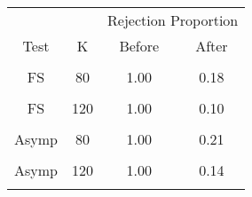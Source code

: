 \begin{table}[!h]
\centering
\begin{tabular}{cccc}
\toprule
\multicolumn{1}{c}{ } & \multicolumn{1}{c}{ } & \multicolumn{2}{c}{Rejection Proportion} \\
\cmidrule(l{3pt}r{3pt}){3-4}
Test & K & Before & After\\
\midrule
\cellcolor{gray!6}{FS} & \cellcolor{gray!6}{60} & \cellcolor{gray!6}{1.00} & \cellcolor{gray!6}{0.13}\\
FS & 80 & 1.00 & 0.18\\
\cellcolor{gray!6}{FS} & \cellcolor{gray!6}{100} & \cellcolor{gray!6}{1.00} & \cellcolor{gray!6}{0.13}\\
FS & 120 & 1.00 & 0.10\\
\cellcolor{gray!6}{Asymp} & \cellcolor{gray!6}{60} & \cellcolor{gray!6}{1.00} & \cellcolor{gray!6}{0.18}\\
\addlinespace
Asymp & 80 & 1.00 & 0.21\\
\cellcolor{gray!6}{Asymp} & \cellcolor{gray!6}{100} & \cellcolor{gray!6}{1.00} & \cellcolor{gray!6}{0.19}\\
Asymp & 120 & 1.00 & 0.14\\
\cellcolor{gray!6}{ECE} & \cellcolor{gray!6}{} & \cellcolor{gray!6}{0.23} & \cellcolor{gray!6}{0.13}\\
\bottomrule
\end{tabular}
\end{table}

